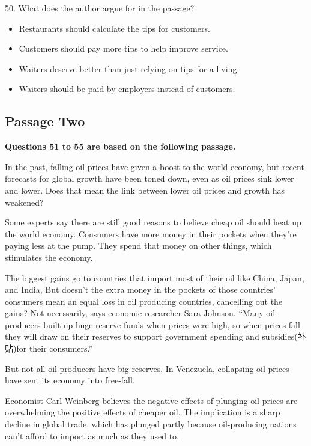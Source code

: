\documentclass[UTF8,11pt]{ctexart}
\begin{document}
50. What does the author argue for in the passage?


\begin{itemize}[leftmargin=2em,itemsep=.2em,topsep=.4em]\item[A.] Restaurants should calculate the tips for customers.
\end{itemize}

\begin{itemize}[leftmargin=2em,itemsep=.2em,topsep=.4em]\item[B.] Customers should pay more tips to help improve service.
\item[C.] Waiters deserve better than just relying on tips for a living.
\item[D.] Waiters should be paid by employers instead of customers.
\end{itemize}

\subsection*{\textbf{Passage Two}}


\textbf{Questions 51 to 55 are based on the following passage.}


In the past, falling oil prices have given a boost to the world economy, but recent forecasts for global growth have been toned down, even as oil prices sink lower and lower. Does that mean the link between lower oil prices and growth has weakened?


Some experts say there are still good reasons to believe cheap oil should heat up the world economy. Consumers have more money in their pockets when they're paying less at the pump. They spend that money on other things, which stimulates the economy.


The biggest gains go to countries that import most of their oil like China, Japan, and India, But doesn't the extra money in the pockets of those countries' consumers mean an equal loss in oil producing countries, cancelling out the gains? Not necessarily, says economic researcher Sara Johnson. “Many oil producers built up huge reserve funds when prices were high, so when prices fall they will draw on their reserves to support government spending and subsidies(补贴)for their consumers.”


But not all oil producers have big reserves, In Venezuela, collapsing oil prices have sent its economy into free-fall.


Economist Carl Weinberg believes the negative effects of plunging oil prices are overwhelming the positive effects of cheaper oil. The implication is a sharp decline in global trade, which has plunged partly because oil-producing nations can't afford to import as much as they used to.
\end{document}
